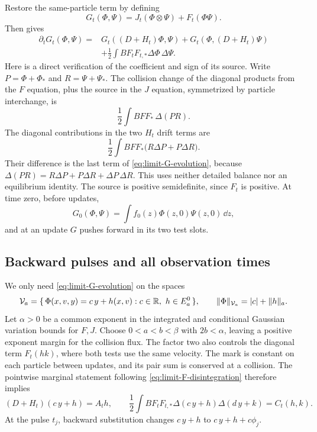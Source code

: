 Restore the same-particle term by defining
\begin{equation}\label{eq:limit-G-definition}
              G_t(\Phi,\Psi)=J_t(\Phi\otimes\Psi)+F_t(\Phi\Psi).
\end{equation}
Then  gives
\begin{equation}\label{eq:limit-G-evolution}
 \begin{split}
 \partial_tG_t(\Phi,\Psi)
   ={}&G_t((D+H_t)\Phi,\Psi)+G_t(\Phi,(D+H_t)\Psi)\\
     &+\frac12\int BF_tF_{t,*}\Delta\Phi\,\Delta\Psi.
 \end{split}
\end{equation}
Here is a direct verification of the coefficient and sign of its
source.  Write \(P=\Phi+\Phi_*\) and \(R=\Psi+\Psi_*\).
The collision change of the diagonal products from the \(F\) equation,
plus the source in the \(J\) equation, symmetrized by particle
interchange, is
\[
                 \frac12\int BFF_*\,\Delta(PR).
\]
The diagonal contributions in the two \(H_t\) drift terms are
\[
                 \frac12\int BFF_*
                       \bigl(R\Delta P+P\Delta R\bigr).
\]
Their difference is the last term of
\eqref{eq:limit-G-evolution}, because
\(\Delta(PR)=R\Delta P+P\Delta R+\Delta P\,\Delta R\).
This uses neither detailed balance nor an equilibrium identity.
The source is positive semidefinite, since \(F_t\) is positive.
At time zero, before updates,
\begin{equation}\label{eq:limit-G-initial}
                   G_0(\Phi,\Psi)=\int f_0(z)\Phi(z,0)\Psi(z,0)\,\dd z,
\end{equation}
and at an update \(G\) pushes forward in its two test slots.

\subsection{Backward pulses and all observation times}

We only need \eqref{eq:limit-G-evolution} on the spaces
\[
 \mathcal V_a=\{\,\Phi(x,v,y)=c\,y+h(x,v):
                   c\in\mathbb R,\ h\in E_a^0\,\},
 \qquad \|\Phi\|_{\mathcal V_a}=|c|+\|h\|_a.
\]
Let \(\alpha>0\) be a common exponent in the integrated and conditional
Gaussian variation bounds for \(F,J\).  Choose \(0<a<b<\beta\)
with \(2b<\alpha\), leaving a positive exponent margin for the
collision flux.  The factor two also controls the diagonal
term \(F_t(hk)\), where both tests use the same velocity.
The mark is constant on each particle between updates, and its pair
sum is conserved at a collision.  The pointwise marginal statement
following \eqref{eq:limit-F-disintegration} therefore implies
\begin{equation}\label{eq:limit-restricted-drift}
 (D+H_t)(c\,y+h)=A_th,\qquad
 \frac12\int BF_tF_{t,*}\Delta(c\,y+h)\Delta(d\,y+k)=C_t(h,k).
\end{equation}
At the pulse \(t_j\), backward substitution changes \(c\,y+h\)
to \(c\,y+h+c\phi_j\).

